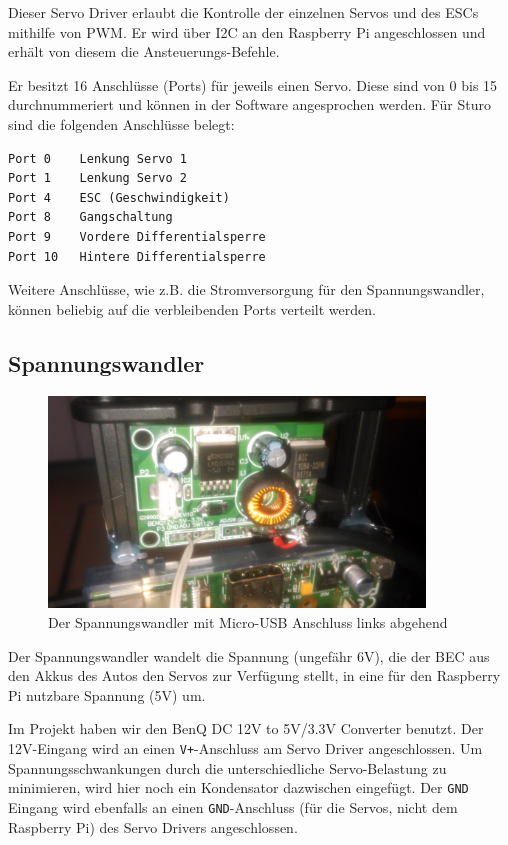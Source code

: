 \documentclass[a4paper,10pt]{scrartcl}
\begin{document}
    Dieser Servo Driver \cite{adafruitmod} erlaubt die Kontrolle der einzelnen
    Servos und des ESCs mithilfe von PWM.
    Er wird über I2C an den Raspberry Pi angeschlossen und erhält von diesem die
    Ansteuerungs-Befehle.

    Er besitzt 16 Anschlüsse (Ports) für jeweils einen Servo.
    Diese sind von 0 bis 15 durchnummeriert und können in der Software
    angesprochen werden.
    Für Sturo sind die folgenden Anschlüsse belegt:

    \begin{lstlisting}
Port 0    Lenkung Servo 1
Port 1    Lenkung Servo 2
Port 4    ESC (Geschwindigkeit)
Port 8    Gangschaltung
Port 9    Vordere Differentialsperre
Port 10   Hintere Differentialsperre
    \end{lstlisting}

    Weitere Anschlüsse, wie z.B. die Stromversorgung für den Spannungswandler,
    können beliebig auf die verbleibenden Ports verteilt werden.

  \subsection{Spannungswandler}

    \begin{figure}[ht!]
      \centering
      \includegraphics[width=100mm]{pics/spannungswandler.jpg}
      \caption{Der Spannungswandler mit Micro-USB Anschluss links abgehend}
    \end{figure}

    Der Spannungswandler wandelt die Spannung (ungefähr 6V), die der BEC aus den
    Akkus des Autos den Servos zur Verfügung stellt, in eine für den
    Raspberry Pi nutzbare Spannung (5V) um.

    Im Projekt haben wir den BenQ DC 12V to 5V/3.3V Converter benutzt.
    Der 12V-Eingang wird an einen \lstinline{V+}-Anschluss am Servo Driver
    angeschlossen.
    Um Spannungsschwankungen durch die unterschiedliche Servo-Belastung zu
    minimieren, wird hier noch ein Kondensator dazwischen eingefügt.
    Der \lstinline{GND} Eingang wird ebenfalls an einen
    \lstinline{GND}-Anschluss (für die Servos, nicht dem Raspberry Pi) des Servo
    Drivers angeschlossen.
\end{document}
